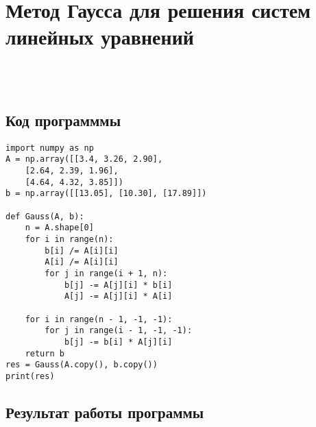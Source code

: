 \documentclass[12pt,a4paper]{article}
\begin{document}
\section{Метод Гаусса для решения систем линейных уравнений}
\\
\\
\subsection{Код программмы}
\begin{verbatim}
import numpy as np
A = np.array([[3.4, 3.26, 2.90],
    [2.64, 2.39, 1.96],
    [4.64, 4.32, 3.85]])
b = np.array([[13.05], [10.30], [17.89]])

def Gauss(A, b):
    n = A.shape[0]
    for i in range(n):
        b[i] /= A[i][i]
        A[i] /= A[i][i]
        for j in range(i + 1, n):
            b[j] -= A[j][i] * b[i]
            A[j] -= A[j][i] * A[i]

    for i in range(n - 1, -1, -1):
        for j in range(i - 1, -1, -1):
            b[j] -= b[i] * A[j][i]
    return b
res = Gauss(A.copy(), b.copy())
print(res)
\end{verbatim}
\subsection{Результат работы программы}
\end{document}
